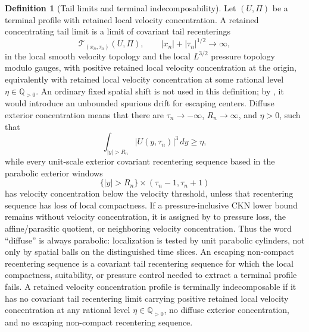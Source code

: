 \documentclass[11pt]{amsart}
\numberwithin{equation}{section}
\theoremstyle{plain}
\theoremstyle{definition}
\newtheorem{definition}[definition]{Definition}
\theoremstyle{remark}
\begin{document}
\begin{definition}[Tail limits and terminal indecomposability]
\label{def:atomic-terminal-profile}
Let \((U,\Pi)\) be a terminal profile with retained local velocity concentration.  A
retained concentrating tail limit is a limit of covariant tail recenterings
\[
   \mathscr T_{(x_n,\tau_n)}(U,\Pi),
   \qquad |x_n|+|\tau_n|^{1/2}\to\infty,
\]
   in the local smooth velocity topology and the local \(L^{3/2}\) pressure
   topology modulo gauges, with positive retained local velocity concentration
   at the origin, equivalently with retained local velocity concentration at
   some rational level \(\eta\in\mathbb Q_{>0}\).  An ordinary fixed spatial
   shift is not used in this definition; by
   , it would introduce an
   unbounded spurious drift for escaping centers.  Diffuse exterior concentration
   means that there are \(\tau_n\to-\infty\), \(R_n\to\infty\), and \(\eta>0\),
   such that
  \[
     \int_{|y|>R_n}|U(y,\tau_n)|^3\,dy\ge\eta,
  \]
   while every unit-scale exterior covariant recentering sequence based in the
   parabolic exterior windows
   \[
      \{|y|>R_n\}\times(\tau_n-1,\tau_n+1)
   \]
   has velocity concentration below the velocity threshold, unless that
   recentering sequence has loss of local compactness.  If a pressure-inclusive
   CKN lower bound remains without velocity concentration, it is assigned by
    to pressure loss, the
   affine/parasitic quotient, or neighboring velocity concentration.
   Thus the word ``diffuse'' is always parabolic: localization is tested by
   unit parabolic cylinders, not only by spatial balls on the distinguished time
   slices.  An escaping non-compact recentering sequence is a
   covariant tail recentering sequence for which the local compactness,
suitability, or pressure control needed to extract a terminal profile fails.  A
retained velocity concentration profile is terminally indecomposable if it has
no covariant tail recentering limit carrying positive retained local velocity
concentration at any rational level \(\eta\in\mathbb Q_{>0}\), no diffuse
exterior concentration, and no escaping non-compact recentering sequence.
\end{definition}
\end{document}
